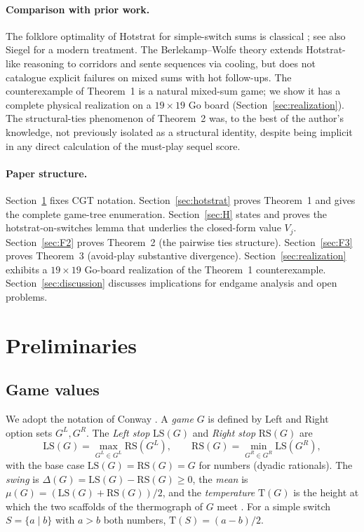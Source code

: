 \documentclass[11pt,a4paper]{amsart}
\theoremstyle{definition}
\theoremstyle{remark}
\newcommand{\LS}{\mathrm{LS}}
\newcommand{\RS}{\mathrm{RS}}
\newcommand{\Tt}{\mathrm{T}}
\begin{document}
\paragraph{Comparison with prior work.}
The folklore optimality of Hotstrat for simple-switch sums is classical
\cite[Ch.~6]{BCG1982}; see also Siegel
\cite[Ch.~III]{Siegel2013} for a modern treatment.
The Berlekamp--Wolfe theory \cite{BW1994} extends Hotstrat-like
reasoning to corridors and sente sequences via cooling, but does not
catalogue explicit failures on mixed sums with hot follow-ups. The
counterexample of Theorem~1 is a natural mixed-sum game; we show it has
a complete physical realization on a $19 \times 19$ Go board
(Section~\ref{sec:realization}). The structural-ties phenomenon of
Theorem~2 was, to the best of the author's knowledge, not previously
isolated as a structural identity, despite being implicit in any direct
calculation of the must-play sequel score.

\paragraph{Paper structure.}
Section~\ref{sec:prelim} fixes CGT notation. Section~\ref{sec:hotstrat}
proves Theorem~1 and gives the complete game-tree enumeration.
Section~\ref{sec:H} states and proves the hotstrat-on-switches lemma
that underlies the closed-form value $V_j$. Section~\ref{sec:F2}
proves Theorem~2 (the pairwise ties structure). Section~\ref{sec:F3}
proves Theorem~3 (avoid-play substantive divergence).
Section~\ref{sec:realization} exhibits a $19 \times 19$ Go-board
realization of the Theorem~1 counterexample.
Section~\ref{sec:discussion} discusses implications for endgame analysis
and open problems.

\section{Preliminaries}\label{sec:prelim}

\subsection{Game values}
We adopt the notation of Conway \cite{Conway1976}. A \emph{game} $G$ is
defined by Left and Right option sets $G^L, G^R$. The
\emph{Left stop} $\LS(G)$ and \emph{Right stop} $\RS(G)$ are
\[
  \LS(G) = \max_{G^L \in G^L} \RS(G^L),
  \qquad
  \RS(G) = \min_{G^R \in G^R} \LS(G^R),
\]
with the base case $\LS(G) = \RS(G) = G$ for numbers (dyadic
rationals). The \emph{swing} is $\Delta(G) = \LS(G) - \RS(G) \geq 0$,
the \emph{mean} is $\mu(G) = (\LS(G) + \RS(G))/2$, and the
\emph{temperature} $\Tt(G)$ is the height at which the two scaffolds of
the thermograph of $G$ meet \cite[Ch.~6]{BCG1982}. For a simple switch
$S = \{a \mid b\}$ with $a > b$ both numbers, $\Tt(S) = (a-b)/2$.
\end{document}
